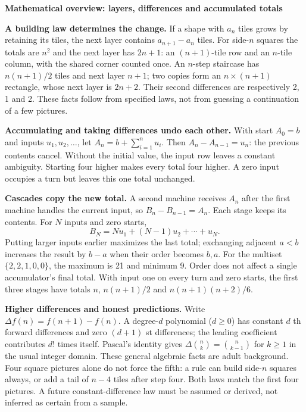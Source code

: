 \documentclass[11pt]{article}
\newcommand{\heading}[1]{\par\textbf{#1}\par}
\begin{document}
\heading{Mathematical overview: layers, differences and accumulated totals}
\textbf{A building law determines the change.} If a shape with $a_n$ tiles grows by retaining its tiles, the next layer contains $a_{n+1}-a_n$ tiles. For side-$n$ squares the totals are $n^2$ and the next layer has $2n+1$: an $(n+1)$-tile row and an $n$-tile column, with the shared corner counted once. An $n$-step staircase has $n(n+1)/2$ tiles and next layer $n+1$; two copies form an $n\times(n+1)$ rectangle, whose next layer is $2n+2$. Their second differences are respectively 2, 1 and 2. These facts follow from specified laws, not from guessing a continuation of a few pictures.

\textbf{Accumulating and taking differences undo each other.} With start $A_0=b$ and inputs $u_1,u_2,\ldots$, let $A_n=b+\sum_{i=1}^n u_i$. Then $A_n-A_{n-1}=u_n$: the previous contents cancel. Without the initial value, the input row leaves a constant ambiguity. Starting four higher makes every total four higher. A zero input occupies a turn but leaves this one total unchanged.

\textbf{Cascades copy the new total.} A second machine receives $A_n$ after the first machine handles the current input, so $B_n-B_{n-1}=A_n$. Each stage keeps its contents. For $N$ inputs and zero starts,
\[B_N=Nu_1+(N-1)u_2+\cdots+u_N.\]
Putting larger inputs earlier maximizes the last total; exchanging adjacent $a<b$ increases the result by $b-a$ when their order becomes $b,a$. For the multiset $\{2,2,1,0,0\}$, the maximum is 21 and minimum 9. Order does not affect a single accumulator's final total. With input one on every turn and zero starts, the first three stages have totals $n$, $n(n+1)/2$ and $n(n+1)(n+2)/6$.

\textbf{Higher differences and honest predictions.} Write $\Delta f(n)=f(n+1)-f(n)$. A degree-$d$ polynomial ($d\geq0$) has constant $d$ th forward differences and zero $(d+1)$ st differences; the leading coefficient contributes $d!$ times itself. Pascal's identity gives $\Delta\binom nk=\binom n{k-1}$ for $k\geq1$ in the usual integer domain. These general algebraic facts are adult background. Four square pictures alone do not force the fifth: a rule can build side-$n$ squares always, or add a tail of $n-4$ tiles after step four. Both laws match the first four pictures. A future constant-difference law must be assumed or derived, not inferred as certain from a sample.
\end{document}
